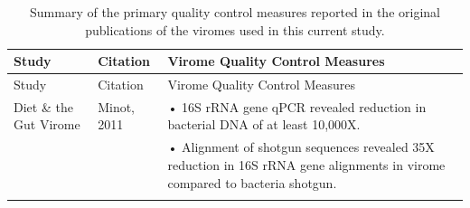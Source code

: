 \documentclass[12pt,]{article}
\begin{document}
\begin{longtable}[]{@{}lll@{}}
\caption{Summary of the primary quality control measures reported in the
original publications of the viromes used in this current
study.}\tabularnewline
\toprule
\begin{minipage}[b]{0.24\columnwidth}\raggedright\strut
Study
\strut\end{minipage} &
\begin{minipage}[b]{0.17\columnwidth}\raggedright\strut
Citation
\strut\end{minipage} &
\begin{minipage}[b]{0.50\columnwidth}\raggedright\strut
Virome Quality Control Measures
\strut\end{minipage}\tabularnewline
\midrule
\endfirsthead
\toprule
\begin{minipage}[b]{0.24\columnwidth}\raggedright\strut
Study
\strut\end{minipage} &
\begin{minipage}[b]{0.17\columnwidth}\raggedright\strut
Citation
\strut\end{minipage} &
\begin{minipage}[b]{0.50\columnwidth}\raggedright\strut
Virome Quality Control Measures
\strut\end{minipage}\tabularnewline
\midrule
\endhead
\begin{minipage}[t]{0.24\columnwidth}\raggedright\strut
Diet \& the Gut Virome
\strut\end{minipage} &
\begin{minipage}[t]{0.17\columnwidth}\raggedright\strut
Minot, 2011
\strut\end{minipage} &
\begin{minipage}[t]{0.50\columnwidth}\raggedright\strut
• 16S rRNA gene qPCR revealed reduction in bacterial DNA of at least
10,000X.
\strut\end{minipage}\tabularnewline
\begin{minipage}[t]{0.24\columnwidth}\raggedright\strut
\strut\end{minipage} &
\begin{minipage}[t]{0.17\columnwidth}\raggedright\strut
\strut\end{minipage} &
\begin{minipage}[t]{0.50\columnwidth}\raggedright\strut
• Alignment of shotgun sequences revealed 35X reduction in 16S rRNA gene
alignments in virome compared to bacteria shotgun.
\strut\end{minipage}\tabularnewline
\begin{minipage}[t]{0.24\columnwidth}\raggedright\strut

\end{minipage}
\end{longtable}
\end{document}
